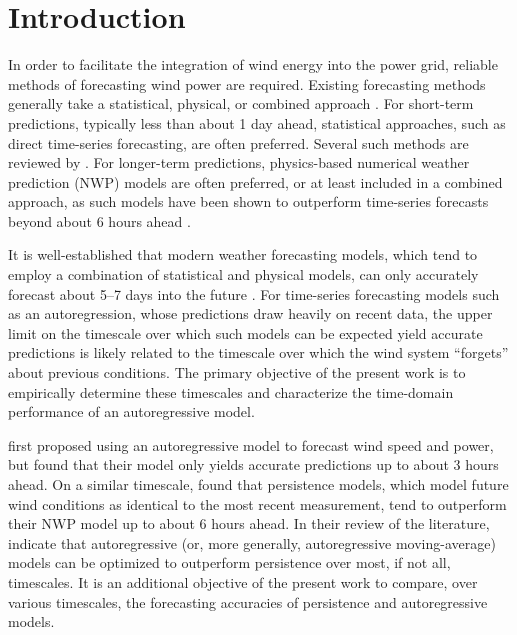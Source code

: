 \documentclass[11pt, oneside]{article}
\begin{document}

\newpage
\pagestyle{pages}
\section{Introduction}
In order to facilitate the integration of wind energy into the power grid, reliable methods of forecasting wind power are required.
Existing forecasting methods generally take a statistical, physical, or combined approach \citep{Wang2011}.
For short-term predictions, typically less than about 1 day ahead, statistical approaches, such as direct time-series forecasting, are often preferred.
Several such methods are reviewed by \citet[Chap.~2]{Giebel2011}.
For longer-term predictions, physics-based numerical weather prediction (NWP) models are often preferred, or at least included in a combined approach, as such models have been shown to outperform time-series forecasts beyond about 6 hours ahead \citep[Sec.~1.3]{Giebel2011}.

It is well-established that modern weather forecasting models, which tend to employ a combination of statistical and physical models, can only accurately forecast about 5--7 days into the future \citep[Sec.~1.2]{Giebel2011}.
For time-series forecasting models such as an autoregression, whose predictions draw heavily on recent data, the upper limit on the timescale over which such models can be expected yield accurate predictions is likely related to the timescale over which the wind system ``forgets'' about previous conditions.
The primary objective of the present work is to empirically determine these timescales and characterize the time-domain performance of an autoregressive model. %

\citet{Brown1984} first proposed using an autoregressive model to forecast wind speed and power, but found that their model only yields accurate predictions up to about 3 hours ahead.
On a similar timescale, \citet{LandbergWatson1994} found that persistence models, which model future wind conditions as identical to the most recent measurement, tend to outperform their NWP model up to about 6 hours ahead.
In their review of the literature, \citet[Sec.~2.1]{Giebel2011} indicate that autoregressive (or, more generally, autoregressive moving-average) models can be optimized to outperform persistence over most, if not all, timescales.
It is an additional objective of the present work to compare, over various timescales, the forecasting accuracies of persistence and autoregressive models.
\end{document}
